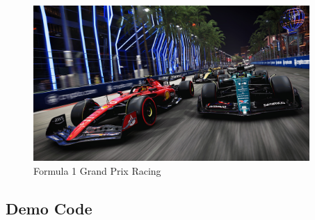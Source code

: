 \documentclass[12pt]{article}
\begin{document}
\begin{figure}[h!]
\begin{center}
\includegraphics[width=10.5cm]{demo1.jpg}\\
Formula 1 Grand Prix Racing
\end{center}
\end{figure}

\subsection{Demo Code}
\end{document}
